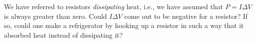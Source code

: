         We have referred to resistors \emph{dissipating} heat,
        i.e., we have assumed that $P=I\Delta V$ is always greater
        than zero.  Could $I\Delta V$ come out to be negative for
        a resistor?  If so, could one make a refrigerator by hooking
        up a resistor in such a way that it absorbed heat instead of dissipating it?
